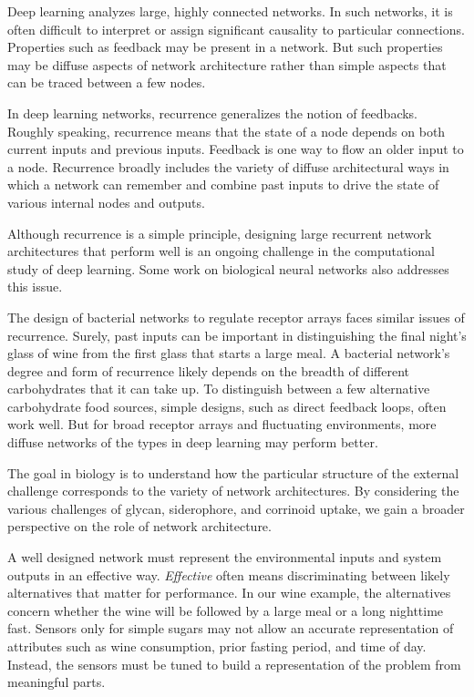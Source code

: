 \documentclass[\mydocfontsize]{article}
\begin{document}
\begin{multicols}{2}
Deep learning analyzes large, highly connected networks. In such networks, it is often difficult to interpret or assign significant causality to particular connections. Properties such as feedback may be present in a network. But such properties may be diffuse aspects of network architecture rather than simple aspects that can be traced between a few nodes. 

In deep learning networks, recurrence generalizes the notion of feedbacks. Roughly speaking, recurrence means that the state of a node depends on both current inputs and previous inputs. Feedback is one way to flow an older input to a node. Recurrence broadly includes the variety of diffuse architectural ways in which a network can remember and combine past inputs to drive the state of various internal nodes and outputs. 

Although recurrence is a simple principle, designing large recurrent network architectures that perform well is an ongoing challenge in the computational study of deep learning. Some work on biological neural networks also addresses this issue. 

The design of bacterial networks to regulate receptor arrays faces similar issues of recurrence. Surely, past inputs can be important in distinguishing the final night's glass of wine from the first glass that starts a large meal. A bacterial network's degree and form of recurrence likely depends on the breadth of different carbohydrates that it can take up. To distinguish between a few alternative carbohydrate food sources, simple designs, such as direct feedback loops, often work well. But for broad receptor arrays and fluctuating environments, more diffuse networks of the types in deep learning may perform better. 

The goal in biology is to understand how the particular structure of the external challenge corresponds to the variety of network architectures. By considering the various challenges of glycan, siderophore, and corrinoid uptake, we gain a broader perspective on the role of network architecture.

 A well designed network must represent the environmental inputs and system outputs in an effective way. \textit{Effective} often means discriminating between likely alternatives that matter for performance. In our wine example, the alternatives concern whether the wine will be followed by a large meal or a long nighttime fast. Sensors only for simple sugars may not allow an accurate representation of attributes such as wine consumption, prior fasting period, and time of day. Instead, the sensors must be tuned to build a representation of the problem from meaningful parts. 


\end{multicols}
\end{document}
